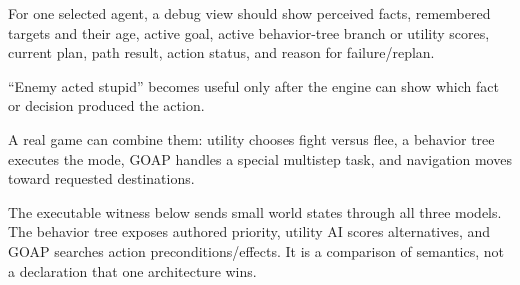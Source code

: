 \hypertarget{06-engine-ii-ch047-ai-needs-observability}{}

For one selected agent, a debug view should show perceived facts, remembered targets and their age, active goal, active behavior-tree branch or utility scores, current plan, path result, action status, and reason for failure/replan.

``Enemy acted stupid'' becomes useful only after the engine can show which fact or decision produced the action.

A real game can combine them: utility chooses fight versus flee, a behavior tree executes the mode, GOAP handles a special multistep task, and navigation moves toward requested destinations.

The executable witness below sends small world states through all three models. The behavior tree exposes authored priority, utility AI scores alternatives, and GOAP searches action preconditions/effects. It is a comparison of semantics, not a declaration that one architecture wins.

